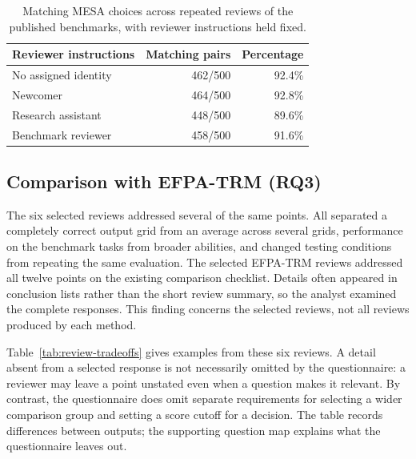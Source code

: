 \documentclass[10pt,conference]{IEEEtran}
\begin{document}
\begin{table}[t]
\caption{Matching MESA choices across repeated reviews of the published benchmarks, with reviewer instructions held fixed.}
\label{tab:agreement}
\centering
\begin{tabular}{@{}lrr@{}}
\toprule
Reviewer instructions & Matching pairs & Percentage \\
\midrule
No assigned identity & 462/500 & 92.4\% \\
Newcomer & 464/500 & 92.8\% \\
Research assistant & 448/500 & 89.6\% \\
Benchmark reviewer & 458/500 & 91.6\% \\
\bottomrule
\end{tabular}
\end{table}

\subsection{Comparison with EFPA-TRM (RQ3)}
The six selected reviews addressed several of the same points. All separated a completely correct output grid from an average across several grids, performance on the benchmark tasks from broader abilities, and changed testing conditions from repeating the same evaluation. The selected EFPA-TRM reviews addressed all twelve points on the existing comparison checklist. Details often appeared in conclusion lists rather than the short review summary, so the analyst examined the complete responses. This finding concerns the selected reviews, not all reviews produced by each method.

Table~\ref{tab:review-tradeoffs} gives examples from these six reviews. A detail absent from a selected response is not necessarily omitted by the questionnaire: a reviewer may leave a point unstated even when a question makes it relevant. By contrast, the questionnaire does omit separate requirements for selecting a wider comparison group and setting a score cutoff for a decision. The table records differences between outputs; the supporting question map explains what the questionnaire leaves out.
\end{document}
